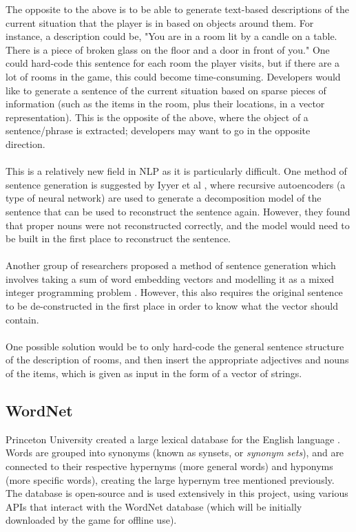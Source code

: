 \documentclass[11pt]{article}
\begin{document}
The opposite to the above is to be able to generate text-based descriptions of the current situation that the player is in based on objects around them. For instance, a description could be, "You are in a room lit by a candle on a table. There is a piece of broken glass on the floor and a door in front of you." One could hard-code this sentence for each room the player visits, but if there are a lot of rooms in the game, this could become time-consuming. Developers would like to generate a sentence of the current situation based on sparse pieces of information (such as the items in the room, plus their locations, in a vector representation). This is the opposite of the above, where the object of a sentence/phrase is extracted; developers may want to go in the opposite direction.
\\
\\
This is a relatively new field in NLP as it is particularly difficult. One method of sentence generation is suggested by Iyyer et al \cite{RefWorks:55}, where recursive autoencoders (a type of neural network) are used to generate a decomposition model of the sentence that can be used to reconstruct the sentence again. However, they found that proper nouns were not reconstructed correctly, and the model would need to be built in the first place to reconstruct the sentence.
\\
\\
Another group of researchers proposed a method of sentence generation which involves taking a sum of word embedding vectors and modelling it as a mixed integer programming problem \cite{RefWorks:54}. However, this also requires the original sentence to be de-constructed in the first place in order to know what the vector should contain.
\\
\\
One possible solution would be to only hard-code the general sentence structure of the description of rooms, and then insert the appropriate adjectives and nouns of the items, which is given as input in the form of a vector of strings.

\subsection{WordNet}

Princeton University created a large lexical database for the English language \cite{RefWorks:20}. Words are grouped into synonyms (known as synsets, or \textit{synonym sets}), and are connected to their respective hypernyms (more general words) and hyponyms (more specific words), creating the large hypernym tree mentioned previously. The database is open-source and is used extensively in this project, using various APIs that interact with the WordNet database (which will be initially downloaded by the game for offline use).
\end{document}
